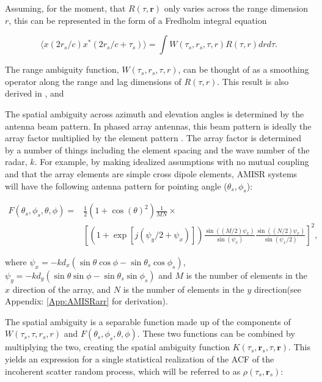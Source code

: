 Assuming, for the moment, that $R(\tau,\mathbf{r})$ only varies across the range dimension $r$, this can be represented in the form of a Fredholm integral equation
 
 \begin{equation}
 \label{eqn:fredfirst}
 \langle x(2r_s/c)x^*(2r_s/c+\tau_s)\rangle = \int W(\tau_s,r_s,\tau,r)R(\tau,r) drd\tau.
 \end{equation}
 
\noindent The range ambiguity function, $W(\tau_s,r_s,\tau,r)$, can be thought of as a smoothing operator along the range and lag dimensions of $R(\tau,r)$. This result is also derived in \cite{nikoukar2008}, \cite{Woodman:1991is} and \cite{hysell2008}

 
The spatial ambiguity across azimuth and elevation angles is determined by the antenna beam pattern. In phased array antennas, this beam pattern is ideally the array factor multiplied by the element pattern \cite{Balanis:2005:ATA:1208379}. The array factor is determined by a number of things including the element spacing and the wave number of the radar, $k$. For example, by making idealized assumptions with no mutual coupling and that the array elements are simple cross dipole elements, AMISR systems will have the following antenna pattern for pointing angle ($\theta_s,\phi_s$): 

 \begin{equation}
 \label{eqn:amisrpat}
 \begin{split}
F(\theta_s,\phi_s,\theta,\phi) =& \frac{1}{2}(1+\cos(\theta)^2)\frac{1}{MN} \times \\
	&\left[ \left(1+\exp\left[j(\psi_y/2 + \psi_x)\right]\right)\frac{\sin((M/2) \psi_x)}{\sin(\psi_x)} \frac{\sin((N/2) \psi_x)}{\sin(\psi_x/2)}\right]^2,
\end{split}
 \end{equation}
 
 \noindent where $\psi_x = -k d_x(\sin\theta\cos\phi-\sin\theta_s\cos\phi_s)$, $\psi_y = -k d_y(\sin\theta\sin\phi-\sin\theta_s\sin\phi_s)$ and $M$ is the number of elements in the $x$ direction of the array, and $N$ is the number of elements in the $y$ direction(see Appendix: \ref{App:AMISRarr} for derivation).


The spatial ambiguity is a separable function made up of the components of $W(\tau_s,\tau,r_s,r)$ and $F(\theta_s,\phi_s,\theta,\phi)$. These two functions can be combined by multiplying the two, creating the spatial ambiguity function  $K(\tau_s,\mathbf{r}_s,\tau,\mathbf{r})$. This yields an expression for a single statistical realization of the ACF of the incoherent scatter random process, which will be referred to as $\rho(\tau_s,\mathbf{r}_s)$:


